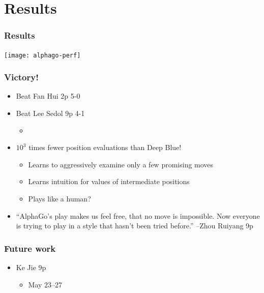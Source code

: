 \documentclass{beamer}
\begin{document}
\section{Results}

\begin{frame}
  \frametitle{Results}
  \texttt{[image: alphago-perf]}
\end{frame}


\begin{frame}
  \frametitle{Victory!}
  \begin{itemize}
  \item Beat Fan Hui 2p 5-0
  \item Beat Lee Sedol 9p 4-1
    \begin{itemize}
    \item \href{http://ps.waltheri.net/database/game/72538/}{}
    \end{itemize}
  \item $10^3$ times fewer position evaluations than Deep Blue!
    \begin{itemize}
    \item Learns to aggressively examine only a few promising moves
    \item Learns intuition for values of intermediate positions
    \item Plays like a human?
    \end{itemize}
    \item ``AlphaGo's play makes us feel free, that no move is impossible. Now everyone is trying to play in a style that hasn't been tried before.'' --Zhou Ruiyang 9p
  \end{itemize}
\end{frame}

\begin{frame}
  \frametitle{Future work}
  \begin{itemize}
  \item Ke Jie 9p
    \begin{itemize}
    \item May 23--27
    \end{itemize}
  \end{itemize}
\end{frame}

\end{document}

